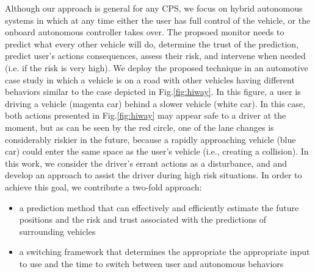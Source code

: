 \documentclass[letterpaper, 10 pt, conference]{ieeeconf}  %
\newcommand\NB[1]{$\spadesuit$\footnote{NB: #1}}
\begin{document}
Although our approach is general for any CPS, we focus on hybrid autonomous systems in which at any time either the user has full control of the vehicle, or the onboard autonomous controller takes over. The propsoed monitor needs to predict what every other vehicle will do, determine the trust of the prediction, predict user's actions consequences, assess their risk, and intervene when needed (i.e. if the risk is very high). We deploy the proposed technique in an automotive case study in which a vehicle is on a road with other vehicles having different behaviors similar to the case depicted in Fig.\ref{fig:hiway}.
In this figure, a user is driving a vehicle (magenta car) behind a slower vehicle (white car). In this case, both actions presented in Fig.\ref{fig:hiway} may appear safe to a driver at the moment, but as can be seen by the red circle, one of the lane changes is considerably riskier in the future, because a rapidly approaching vehicle (blue car) could enter the same space as the user's vehicle (i.e., creating a collision). In this work, we consider the driver's errant actions as a disturbance, and and develop an approach to assist the driver during high risk situations. In order to achieve this goal, we contribute a two-fold approach:
    \begin{itemize}
    \item{a prediction method that can effectively and efficiently estimate the future positions and the risk and trust associated with the predictions of surrounding vehicles} %
    \item{a switching framework that determines the appropriate the appropriate input to use and the time to switch between user and autonomous behaviors} %
    \end{itemize}
\end{document}
